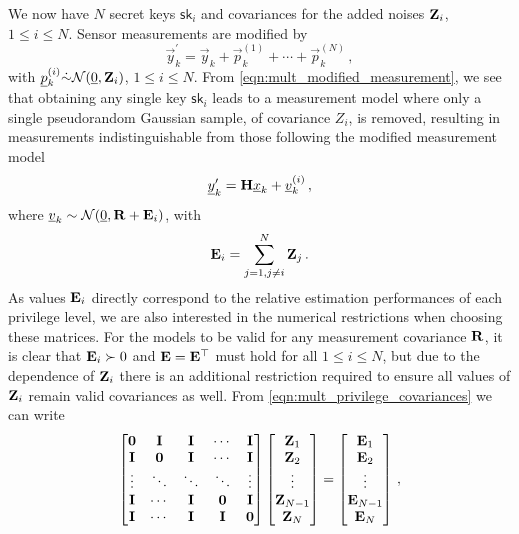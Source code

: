 \documentclass[letterpaper, 10 pt, conference]{IEEEtran}
\theoremstyle{definition}
\theoremstyle{definition}
\theoremstyle{remark}
\begin{document}
We now have $N$ secret keys $\mathsf{sk}_i$ and covariances for the added noises ${{\mathbf{Z}}}_i$, $1\leq i \leq N$. Sensor measurements are modified by
\begin{equation}\label{eqn:mult_modified_measurement}
   \vec{y}^\prime_k = \vec{y}_k + \vec{p}^{(1)}_k + \cdots + \vec{p}^{(N)}_k\,,
\end{equation}
with ${\underline{p}}^{(i)}_k \dot{\sim} \mathcal{N}({\underline{0}}, {{\mathbf{Z}}}_i)$, $1\leq i \leq N$. From \eqref{eqn:mult_modified_measurement}, we see that obtaining any single key $\mathsf{sk}_i$ leads to a measurement model where only a single pseudorandom Gaussian sample, of covariance $Z_i$, is removed, resulting in measurements indistinguishable from those following the modified measurement model
\begin{equation}
   {\underline{y}}^\prime_k = {{\mathbf{H}}}{\underline{x}}_k + {\underline{v}}^{(i)}_k\,,
\end{equation}
where ${\underline{v}}_k\sim \mathcal{N}({\underline{0}},{{\mathbf{R}}}+{{\mathbf{E}}}_i)$, with
\begin{equation}\label{eqn:mult_privilege_covariances}
   \mat{E}_i = \sum^N_{j=1,j \neq i}\mat{Z}_j\,.
\end{equation}
As values ${{\mathbf{E}}}_i$ directly correspond to the relative estimation performances of each privilege level, we are also interested in the numerical restrictions when choosing these matrices. For the models to be valid for any measurement covariance ${{\mathbf{R}}}$, it is clear that ${{\mathbf{E}}}_i\succ 0$ and ${{\mathbf{E}}}={{\mathbf{E}}}^\top$ must hold for all $1\leq i\leq N$, but due to the dependence of ${{\mathbf{Z}}}_i$ there is an additional restriction required to ensure all values of ${{\mathbf{Z}}}_i$ remain valid covariances as well. From \eqref{eqn:mult_privilege_covariances} we can write
\begin{equation}
   \begin{bmatrix}
      {\ensuremath{{\mathbf{0}}}} & {{\mathbf{I}}} & {{\mathbf{I}}} & \cdots & {{\mathbf{I}}}\\
      {{\mathbf{I}}} & {{\mathbf{0}}} & {{\mathbf{I}}} & \cdots & {{\mathbf{I}}}\\
      \vdots & \ddots & \ddots & \ddots & \vdots\\
      {{\mathbf{I}}} & \cdots & {{\mathbf{I}}} & {{\mathbf{0}}} & {{\mathbf{I}}}\\
      {{\mathbf{I}}} & \cdots & {{\mathbf{I}}} & {{\mathbf{I}}} & {{\mathbf{0}}}
   \end{bmatrix}
   \begin{bmatrix}
      {\ensuremath{{\mathbf{Z}}}}_1\\
      {{\mathbf{Z}}}_2\\
      \vdots\\
      {{\mathbf{Z}}}_{N-1}\\
      {{\mathbf{Z}}}_N
   \end{bmatrix}
   =
   \begin{bmatrix}
      {\ensuremath{{\mathbf{E}}}}_1\\
      {{\mathbf{E}}}_2\\
      \vdots\\
      {{\mathbf{E}}}_{N-1}\\
      {{\mathbf{E}}}_N
   \end{bmatrix}\,,
\end{equation}
\end{document}
